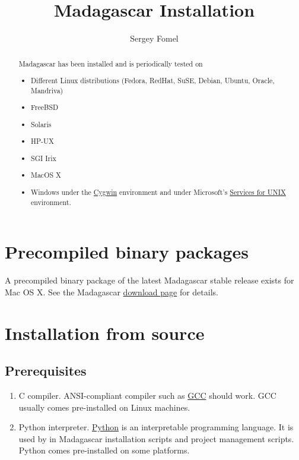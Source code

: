 \title{Madagascar Installation}
\author{Sergey Fomel}

%

\maketitle

\begin{abstract}
Madagascar has been installed and is periodically tested on
\begin{itemize}
\item Different Linux distributions (Fedora, RedHat, SuSE, Debian, Ubuntu, Oracle, Mandriva)
\item FreeBSD
\item Solaris
\item HP-UX
\item SGI Irix
\item MacOS X
\item Windows under the \href{http://www.cygwin.com/}{Cygwin} environment and 
under Microsoft's \href{http://www.microsoft.com/technet/interopmigration/unix/sfu/default.mspx}{Services for UNIX} environment.
\end{itemize}
\end{abstract}

\section{Precompiled binary packages}

A precompiled binary package of the latest Madagascar stable release
exists for Mac OS X. See the Madagascar
\href{http://rsf.sourceforge.net/Download}{download page} for details.

\section{Installation from source}

\subsection{Prerequisites}

\begin{enumerate}
\item C compiler. ANSI-compliant compiler such as
  \href{http://gcc.gnu.org/}{GCC} should work. GCC usually comes pre-installed
  on Linux machines.
\item Python interpreter. \href{http://www.python.org/}{Python} is an
  interpretable programming language. It is used by in Madagascar
  installation scripts and project management scripts.  Python comes
  pre-installed on some platforms.
\end{enumerate}


